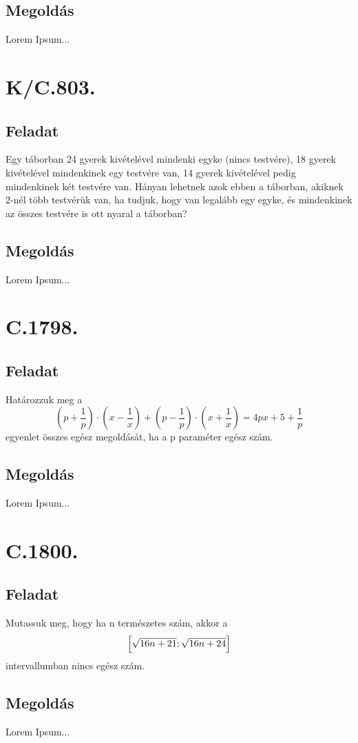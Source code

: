 \documentclass[a4paper,12pt]{article}
\begin{document}
\subsection*{Megoldás}
Lorem Ipsum...

\section*{\Large K/C.803.}\label{par:5}
\subsection*{Feladat}
Egy táborban 24 gyerek kivételével mindenki egyke (nincs testvére), 18 gyerek kivételével mindenkinek egy testvére van, 14 gyerek kivételével pedig mindenkinek két testvére van. Hányan lehetnek azok ebben a táborban, akiknek 2-nél több testvérük van, ha tudjuk, hogy van legalább egy egyke, és mindenkinek az összes testvére is ott nyaral a táborban? 
\subsection*{Megoldás}
Lorem Ipsum...

\section*{\Large C.1798.}\label{par:6}
\subsection*{Feladat}
Határozzuk meg a
$$ \left(p+\frac{1}{p}\right)\cdot\left(x-\frac{1}{x}\right)+\left(p-\frac{1}{p}\right)\cdot\left(x+\frac{1}{x}\right)=4px+5+\frac{1}{p} $$
egyenlet összes egész megoldását, ha a p paraméter egész szám. 
\subsection*{Megoldás}
Lorem Ipsum...

\section*{\Large C.1800.}\label{par:7}
\subsection*{Feladat}
Mutassuk meg, hogy ha n természetes szám, akkor a
$$ \Bigl[\sqrt{16n+21}; \sqrt{16n+24}\Bigr] $$
intervallumban nincs egész szám. 
\subsection*{Megoldás}
Lorem Ipsum...
\end{document}
